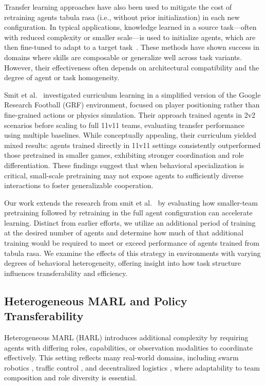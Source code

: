 \documentclass{article}
\begin{document}
Transfer learning approaches have also been used to mitigate the cost of retraining agents 
tabula rasa (i.e., without prior initialization) in each new configuration. 
In typical applications, knowledge learned in a source task—often with reduced 
complexity or smaller scale—is used to initialize agents, 
which are then fine-tuned to adapt to a target task~\cite{cui2022}. 
These methods have shown success in domains where skills are composable 
or generalize well across task variants. However, their effectiveness often 
depends on architectural compatibility and the degree of agent or task homogeneity.

Smit et al.~\cite{smit2023} investigated curriculum learning in a simplified version of the 
Google Research Football (GRF) environment, focused on player positioning rather than 
fine-grained actions or physics simulation. Their approach trained agents in 2v2 scenarios 
before scaling to full 11v11 teams, evaluating transfer performance using multiple baselines. 
While conceptually appealing, their curriculum yielded mixed results: agents trained directly 
in 11v11 settings consistently outperformed those pretrained in smaller games, exhibiting 
stronger coordination and role differentiation. These findings suggest that when behavioral 
specialization is critical, small-scale pretraining may not expose agents to sufficiently 
diverse interactions to foster generalizable cooperation.

Our work extends the research from smit et al.~\cite{smit2023}
by evaluating how smaller-team pretraining followed 
by retraining in the full agent configuration can accelerate learning. 
Distinct from earlier efforts, we utilize an additional period of training at 
the desired number of agents and determine how much of that additional training would 
be required to meet or exceed performance of agents trained from tabula rasa.
We examine the effects of this strategy in environments with varying degrees of 
behavioral heterogeneity, offering insight into how task structure influences 
transferability and efficiency.

\subsection{Heterogeneous MARL and Policy Transferability}

Heterogeneous MARL (HARL) introduces additional complexity by requiring agents with 
differing roles, capabilities, or observation modalities to coordinate effectively. 
This setting reflects many real-world domains, including swarm robotics \cite{hoang2023}, 
traffic control \cite{calvo2018}, and decentralized logistics \cite{rizk2019}, 
where adaptability to team composition and role diversity is essential.
\end{document}
